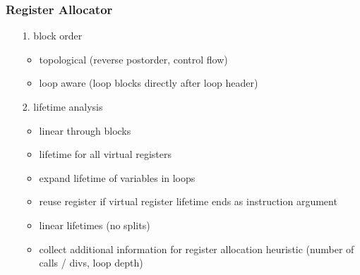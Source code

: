\documentclass[navbaroff,en]{sdqbeamer}
\begin{document}
\begin{frame}
    \frametitle{Register Allocator}

    \begin{itemize}
        \item[1.] block order
        \begin{itemize}
            \item topological (reverse postorder, control flow)
            \item loop aware (loop blocks directly after loop header)
        \end{itemize}
        \item[2.] lifetime analysis
        \begin{itemize}
            \item linear through blocks
            \item lifetime for all virtual registers
            \item expand lifetime of variables in loops
            \item reuse register if virtual register lifetime ends as instruction argument
            \item linear lifetimes (no splits)
            \item collect additional information for register allocation heuristic (number of calls / divs, loop depth)
        \end{itemize}
    \end{itemize}

\end{frame}
\end{document}
